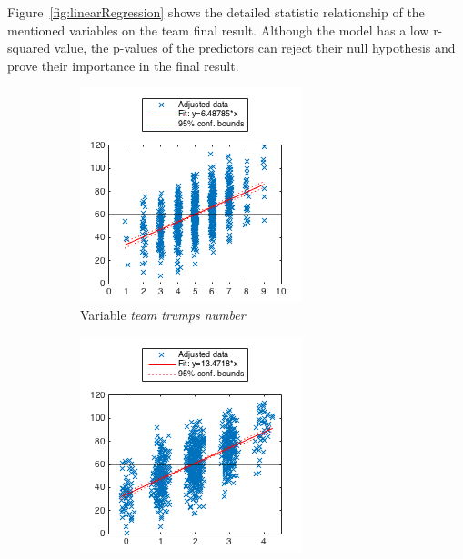 Figure~\ref{fig:linearRegression} shows the detailed statistic relationship of the mentioned variables on the team final result.
Although the model has a low r-squared value, the p-values of the predictors can reject their null hypothesis and prove their importance in the final result.

\begin{figure}[h]
        \centering
        \begin{subfigure}[h]{0.32\textwidth}
                \includegraphics[width=\textwidth]{./img/4/teamTrumpsNumber}
                \caption{Variable \emph{team trumps number}}
                \label{fig:teamTrumpsNumber}
        \end{subfigure}
        \begin{subfigure}[h]{0.32\textwidth}
                \includegraphics[width=\textwidth]{./img/4/teamAcesNumber}

\end{subfigure}
\end{figure}
